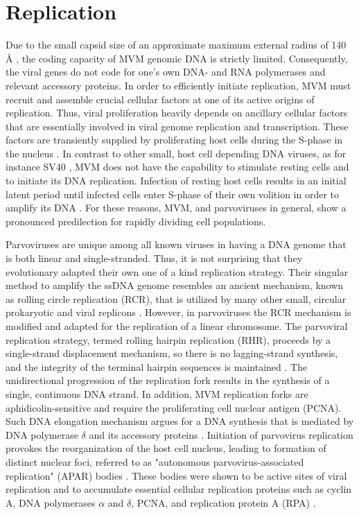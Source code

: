 \section{Replication}
\label{Replication}
Due to the small capsid size of an approximate maximum external radius of 140 \r{A} \cite{pmid15299974}, the coding capacity of MVM genomic DNA is strictly limited. Consequently, the viral genes do not code for one's own DNA- and RNA polymerases and relevant accessory proteins. In order to efficiently initiate replication, MVM must recruit and assemble crucial cellular factors at one of its active origins of replication. Thus, viral proliferation heavily depends on ancillary cellular factors that are essentially involved in viral genome replication and transcription. These factors are transiently supplied by proliferating host cells during the S-phase in the nucleus \cite{pmid16789120, pmid6602221, pmid3005655, pmid3296697, pmid9418888, pmid4673484, S-phase}. In contrast to other small, host cell depending DNA viruses, as for instance SV40 \cite{pmid4291013, pmid16578647}, MVM does not have the capability to stimulate resting cells and to initiate its DNA replication. Infection of resting host cells results in an initial latent period until infected cells enter S-phase of their own volition in order to amplify its DNA \cite{pmid4673484, pmid3346950, pmid10792046}. For these reasons, MVM, and parvoviruses in general, show a pronounced predilection for rapidly dividing cell populations. 

Parvoviruses are unique among all known viruses in having a DNA genome that is both linear and single-stranded. Thus, it is not surprising that they evolutionary adapted their own one of a kind replication strategy. Their singular method to amplify the ssDNA genome resembles an ancient mechanism, known as rolling circle replication (RCR), that is utilized by many other small, circular prokaryotic and viral replicons \cite{pmid1630899, pmid8374079, pmid8824773, pmid9092519, pmid9010307}. However, in parvoviruses the RCR mechanism is modified and adapted for the replication of a linear chromosome. The parvoviral replication strategy, termed rolling hairpin replication (RHR), proceeds by a single-strand displacement mechanism, so there is no lagging-strand synthesis, and the integrity of the terminal hairpin sequences is maintained \cite{pmid967244}. The unidirectional progression of the replication fork results in the synthesis of a single, continuous DNA strand. In addition, MVM replication forks are aphidicolin-sensitive and require the proliferating cell nuclear antigen (PCNA). Such DNA elongation mechanism argues for a DNA synthesis that is mediated by DNA polymerase $\delta$ and its accessory proteins \cite{pmid10792046, pmid12050365, pmid9525597}. Initiation of parvovirus replication provokes the reorganization of the host cell nucleus, leading to formation of distinct nuclear foci, referred to as "autonomous parvovirus-associated replication" (APAR) bodies \cite{pmid11287588, pmid10775619, pmid11907229}. These bodies were shown to be active sites of viral replication and to accumulate essential cellular replication proteins such as cyclin A, DNA polymerases $\alpha$ and $\delta$, PCNA, and replication protein A (RPA) \cite{pmid10792046}. 


